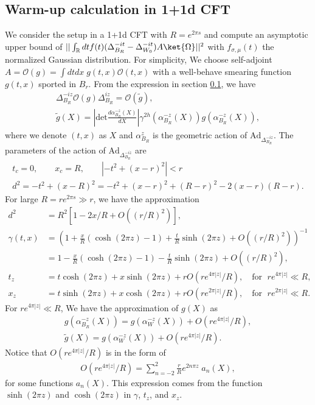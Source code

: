\documentclass[a4paper,11pt]{article}
\theoremstyle{definition}
\theoremstyle{remark}
\begin{document}
\subsection{Warm-up calculation in 1+1d CFT}
We consider the setup in a 1+1d CFT with $R = e^{2\pi s}$ and compute an asymptotic upper bound of $||\int_\mathbb{R} dt f(t)(\Delta_{B_R}^{-it} - \Delta_{W_0}^{-it})A\ket{\Omega}||^2$ with $f_{\sigma,\mu}(t)$ the normalized Gaussian distribution. For simplicity, We choose self-adjoint $A = \mathcal{O}(g) = \int dtdx \;g(t,x) \mathcal{O}(t,x)$ with a well-behave smearing function $g(t,x)$ sported in $B_{r}$. From the expression in section \ref{}, we have 
\begin{gather}
    \Delta_{B_R}^{-iz} \mathcal{O}(g) \Delta_{B_R}^{iz} = \mathcal{O}(\tilde{g}),\\
    \tilde{g}(X) = \left|\text{det}\frac{d\alpha_{B_R}^{-z}(X)}{dX}\right|\gamma^{2h}(\alpha_{B_R}^{-z}(X)) g(\alpha_{B_R}^{-z}(X)),
\end{gather}
where we denote $(t,x)$ as $X$ and $\alpha_{B_R}^{z}$ is the geometric action of $\text{Ad}_{ \Delta_{B_R}^{-iz}}$. The parameters of the action of $\text{Ad}_{\Delta_{B_R}^{-iz}}$ are
\begin{gather}
    t_c = 0, \qquad x_c  = R, \qquad 
    |-t^2 + (x-r)^2| < r\\
    d^2 = -t^2 +(x-R)^2 = -t^2 + (x-r)^2 +(R-r)^2 - 2(x-r)(R-r).
\end{gather}
For large $R=re^{2\pi s}\gg r$, we have the approximation
\begin{align}
    d^2 &= R^2\left[1 -2x/R +O({(r/R)}^2)\right],\\
    \gamma(t,x)&= \left(1 + \frac{x}{R}(\cosh(2\pi z) -1)+\frac{t}{R}\sinh (2\pi z) + O((r/R)^2)\right)^{-1}\nonumber\\
    &= 1 - \frac{x}{R}(\cosh(2\pi z) -1)-\frac{t}{R}\sinh (2\pi z) + O((r/R)^2),\\
    t_z &= t\cosh (2\pi z) + x\sinh (2\pi z) + r O(re^{4\pi|z|}/R), \quad \text{for } \;re^{4\pi|z|}\ll R,\\
    x_z &= t\sinh (2\pi z) + x\cosh (2\pi z) + r O(re^{2\pi|z|}/R), \quad \text{for } \;re^{2\pi|z|}\ll R.
\end{align}
For $re^{4\pi|z|}\ll R$, We have the approximation of $g(X)$ as
\begin{gather}
    g(\alpha_{B_R}^{-z}(X)) = g(\alpha_{W}^{-z}(X)) + O(re^{4\pi|z|}/R),\\
    \tilde{g}(X) = g(\alpha_{W}^{-z}(X)) + O(re^{4\pi|z|}/R).
\end{gather}
Notice that $O(re^{4\pi|z|}/R)$ is in the form of
\begin{align}
    O(re^{4\pi|z|}/R) = \sum_{n=-2}^2\frac{r}{R} e^{2n\pi z} \; a_n(X),
\end{align}
for some functions $a_n(X)$. This expression comes from the function $\sinh(2\pi z)$ and $\cosh(2\pi z)$ in $\gamma$, $t_z$, and $x_z$.
\end{document}
